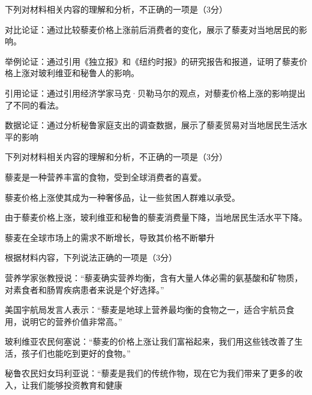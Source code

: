 \documentclass[zihao = -4]{exam-zh}
\begin{document}
       \begin{question}
         下列对材料相关内容的理解和分析，不正确的一项是（3分）
         \begin{choices}
           \item  对比论证：通过比较藜麦价格上涨前后消费者的变化，展示了藜麦对当地居民的影响。 

           \item  举例论证：通过引用《独立报》和《纽约时报》的研究报告和报道，证明了藜麦价格上涨对玻利维亚和秘鲁人的影响。 

           \item  引用论证：通过引用经济学家马克·贝勒马尔的观点，对藜麦价格上涨的影响提出了不同的看法。 

           \item  数据论证：通过分析秘鲁家庭支出的调查数据，展示了藜麦贸易对当地居民生活水平的影响

         \end{choices}
       \end{question}

       \begin{question}
         下列对材料相关内容的理解和分析，不正确的一项是（3分）
         \begin{choices}
           \item 藜麦是一种营养丰富的食物，受到全球消费者的喜爱。

           \item 藜麦价格上涨使其成为一种奢侈品，让一些贫困人群难以承受。

           \item 由于藜麦价格上涨，玻利维亚和秘鲁的藜麦消费量下降，当地居民生活水平下降。

           \item 藜麦在全球市场上的需求不断增长，导致其价格不断攀升

         \end{choices}
       \end{question}

       \begin{question}
         根据材料内容，下列说法正确的一项是（3分）
         \begin{choices}
           \item  营养学家张教授说：“藜麦确实营养均衡，含有大量人体必需的氨基酸和矿物质，对素食者和肠胃疾病患者来说是个好选择。”

           \item  美国宇航局发言人表示：“藜麦是地球上营养最均衡的食物之一，适合宇航员食用，说明它的营养价值非常高。”

           \item   玻利维亚农民何塞说：“藜麦的价格上涨让我们富裕起来，我们用这些钱改善了生活，孩子们也能吃到更好的食物。”

           \item  秘鲁农民妇女玛利亚说：“藜麦是我们的传统作物，现在它为我们带来了更多的收入，让我们能够投资教育和健康

         \end{choices}
       \end{question}
\end{document}
